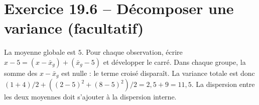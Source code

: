 \section*{Exercice 19.6 -- Décomposer une variance (facultatif)}
La moyenne globale est $5$. Pour chaque observation, écrire $x-5=(x-\bar x_g)+(\bar x_g-5)$ et développer le carré. Dans chaque groupe, la somme des $x-\bar x_g$ est nulle : le terme croisé disparaît. La variance totale est donc $(1+4)/2+((2-5)^2+(8-5)^2)/2=2{,}5+9=11{,}5$. La dispersion entre les deux moyennes doit s'ajouter à la dispersion interne.
